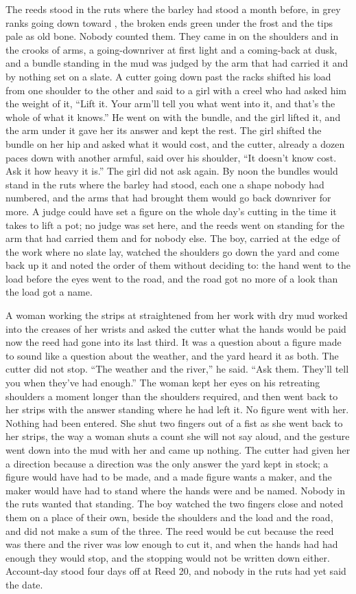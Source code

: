 The reeds stood in the ruts where the barley had stood a month before, in grey ranks going down toward , the broken ends green under the frost and the tips pale as old bone. Nobody counted them. They came in on the shoulders and in the crooks of arms, a going-downriver at first light and a coming-back at dusk, and a bundle standing in the mud was judged by the arm that had carried it and by nothing set on a slate. A cutter going down past the racks shifted his load from one shoulder to the other and said to a girl with a creel who had asked him the weight of it, “Lift it. Your arm'll tell you what went into it, and that's the whole of what it knows.” He went on with the bundle, and the girl lifted it, and the arm under it gave her its answer and kept the rest. The girl shifted the bundle on her hip and asked what it would cost, and the cutter, already a dozen paces down with another armful, said over his shoulder, “It doesn't know cost. Ask it how heavy it is.” The girl did not ask again. By noon the bundles would stand in the ruts where the barley had stood, each one a shape nobody had numbered, and the arms that had brought them would go back downriver for more. A judge could have set a figure on the whole day's cutting in the time it takes to lift a pot; no judge was set here, and the reeds went on standing for the arm that had carried them and for nobody else. The boy, carried at the edge of the work where no slate lay, watched the shoulders go down the yard and come back up it and noted the order of them without deciding to: the hand went to the load before the eyes went to the road, and the road got no more of a look than the load got a name.

A woman working the strips at  straightened from her work with dry mud worked into the creases of her wrists and asked the cutter what the hands would be paid now the reed had gone into its last third. It was a question about a figure made to sound like a question about the weather, and the yard heard it as both. The cutter did not stop. “The weather and the river,” he said. “Ask them. They'll tell you when they've had enough.” The woman kept her eyes on his retreating shoulders a moment longer than the shoulders required, and then went back to her strips with the answer standing where he had left it. No figure went with her. Nothing had been entered. She shut two fingers out of a fist as she went back to her strips, the way a woman shuts a count she will not say aloud, and the gesture went down into the mud with her and came up nothing. The cutter had given her a direction because a direction was the only answer the yard kept in stock; a figure would have had to be made, and a made figure wants a maker, and the maker would have had to stand where the hands were and be named. Nobody in the ruts wanted that standing. The boy watched the two fingers close and noted them on a place of their own, beside the shoulders and the load and the road, and did not make a sum of the three. The reed would be cut because the reed was there and the river was low enough to cut it, and when the hands had had enough they would stop, and the stopping would not be written down either. Account-day stood four days off at Reed 20, and nobody in the ruts had yet said the date.

